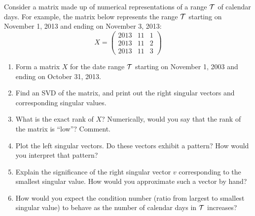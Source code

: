 \documentclass[11pt]{article}
\begin{document}
Consider a matrix made up of numerical representations of a range ${\cal T}$ of calendar days. For example, the matrix below represents the range ${\cal T}$ starting on November 1, 2013 and ending on November 3, 2013:
\[
X = \left(\begin{array}{ccc}
2013 &         11       &     1       \\
        2013      &     11        &    2     \\
        2013      &     11     &       3     \end{array} \right)
\]
\begin{enumerate}
    \item Form a matrix $X$ for the date range ${\cal T}$ starting on November 1, 2003 and ending on October 31, 2013.
    \item Find an SVD of the matrix, and print out the right singular vectors and corresponding singular values.
    \item What is the exact rank of $X$?  Numerically, would you say that the rank of the matrix is ``low''? Comment.
    \item Plot the left singular vectors. Do these vectors exhibit a pattern? How would you interpret that pattern?
    \item Explain the significance of the right singular vector $v$ corresponding to the smallest singular value. How would you approximate such a vector by hand?
    \item How would you expect the condition number (ratio from largest to smallest singular value) to behave as the number of calendar days in ${\cal T}$ increases?
\end{enumerate}
\end{document}
